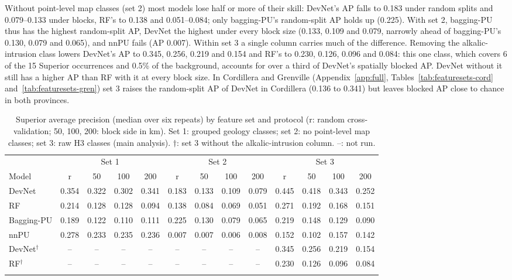 \documentclass[pdflatex,sn-apa]{sn-jnl}
\begin{document}
Without point-level map classes (set 2) most models lose half or more of their skill: DevNet's AP falls to 0.183 under random splits and 0.079--0.133 under blocks, RF's to 0.138 and 0.051--0.084; only bagging-PU's random-split AP holds up (0.225). With set 2, bagging-PU thus has the highest random-split AP, DevNet the highest under every block size (0.133, 0.109 and 0.079, narrowly ahead of bagging-PU's 0.130, 0.079 and 0.065), and nnPU fails (AP 0.007). Within set 3 a single column carries much of the difference. Removing the alkalic-intrusion class lowers DevNet's AP to 0.345, 0.256, 0.219 and 0.154 and RF's to 0.230, 0.126, 0.096 and 0.084: this one class, which covers 6 of the 15 Superior occurrences and 0.5\% of the background, accounts for over a third of DevNet's spatially blocked AP. DevNet without it still has a higher AP than RF with it at every block size. In Cordillera and Grenville (Appendix~\ref{app:full}, Tables~\ref{tab:featuresets-cord} and~\ref{tab:featuresets-gren}) set 3 raises the random-split AP of DevNet in Cordillera (0.136 to 0.341) but leaves blocked AP close to chance in both provinces.

\begin{table}[t]
\caption{Superior average precision (median over six repeats) by feature set and protocol (r: random cross-validation; 50, 100, 200: block side in km). Set 1: grouped geology classes; set 2: no point-level map classes; set 3: raw H3 classes (main analysis). $\dagger$: set 3 without the alkalic-intrusion column. --: not run.}\label{tab:featuresets}
\scriptsize
\setlength{\tabcolsep}{1.5pt}
\begin{tabular*}{\textwidth}{@{\extracolsep\fill}lcccccccccccc}
\toprule
 & \multicolumn{4}{c}{Set 1} & \multicolumn{4}{c}{Set 2} & \multicolumn{4}{c}{Set 3} \\
\cmidrule(lr){2-5}\cmidrule(lr){6-9}\cmidrule(lr){10-13}
Model & r & 50 & 100 & 200 & r & 50 & 100 & 200 & r & 50 & 100 & 200 \\
\midrule
DevNet & 0.354 & 0.322 & 0.302 & 0.341 & 0.183 & 0.133 & 0.109 & 0.079 & 0.445 & 0.418 & 0.343 & 0.252 \\
RF & 0.214 & 0.128 & 0.128 & 0.094 & 0.138 & 0.084 & 0.069 & 0.051 & 0.271 & 0.192 & 0.168 & 0.151 \\
Bagging-PU & 0.189 & 0.122 & 0.110 & 0.111 & 0.225 & 0.130 & 0.079 & 0.065 & 0.219 & 0.148 & 0.129 & 0.090 \\
nnPU & 0.278 & 0.233 & 0.235 & 0.236 & 0.007 & 0.007 & 0.006 & 0.008 & 0.152 & 0.102 & 0.157 & 0.142 \\
DevNet$^\dagger$ & -- & -- & -- & -- & -- & -- & -- & -- & 0.345 & 0.256 & 0.219 & 0.154 \\
RF$^\dagger$ & -- & -- & -- & -- & -- & -- & -- & -- & 0.230 & 0.126 & 0.096 & 0.084 \\
\botrule
\end{tabular*}
\end{table}
\end{document}
